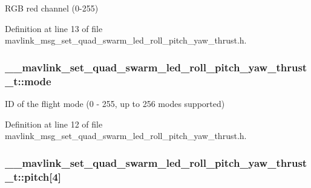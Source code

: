 R\-G\-B red channel (0-\/255) 



Definition at line 13 of file mavlink\-\_\-msg\-\_\-set\-\_\-quad\-\_\-swarm\-\_\-led\-\_\-roll\-\_\-pitch\-\_\-yaw\-\_\-thrust.\-h.

\hypertarget{struct____mavlink__set__quad__swarm__led__roll__pitch__yaw__thrust__t_ac8dd7ef2a6d82c612c439624393b8fa3}{
\subsubsection[{mode}]{ \-\_\-\-\_\-mavlink\-\_\-set\-\_\-quad\-\_\-swarm\-\_\-led\-\_\-roll\-\_\-pitch\-\_\-yaw\-\_\-thrust\-\_\-t\-::mode}}\label{struct____mavlink__set__quad__swarm__led__roll__pitch__yaw__thrust__t_ac8dd7ef2a6d82c612c439624393b8fa3}


I\-D of the flight mode (0 -\/ 255, up to 256 modes supported) 



Definition at line 12 of file mavlink\-\_\-msg\-\_\-set\-\_\-quad\-\_\-swarm\-\_\-led\-\_\-roll\-\_\-pitch\-\_\-yaw\-\_\-thrust.\-h.

\hypertarget{struct____mavlink__set__quad__swarm__led__roll__pitch__yaw__thrust__t_ab83ea414a1102e542d30db140ce41aa6}{
\subsubsection[{pitch}]{ \-\_\-\-\_\-mavlink\-\_\-set\-\_\-quad\-\_\-swarm\-\_\-led\-\_\-roll\-\_\-pitch\-\_\-yaw\-\_\-thrust\-\_\-t\-::pitch\mbox{[}4\mbox{]}}}\label{struct____mavlink__set__quad__swarm__led__roll__pitch__yaw__thrust__t_ab83ea414a1102e542d30db140ce41aa6}


